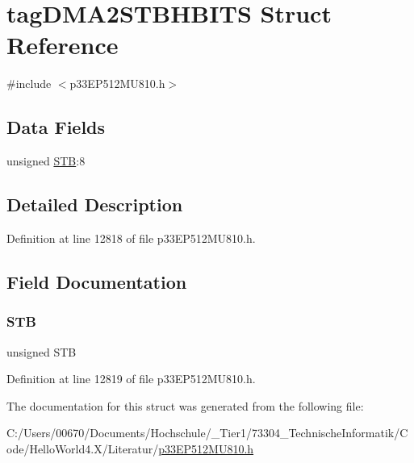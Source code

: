 \hypertarget{structtag_d_m_a2_s_t_b_h_b_i_t_s}{}\section{tag\+D\+M\+A2\+S\+T\+B\+H\+B\+I\+TS Struct Reference}
\label{structtag_d_m_a2_s_t_b_h_b_i_t_s}


{\ttfamily \#include $<$p33\+E\+P512\+M\+U810.\+h$>$}

\subsection*{Data Fields}
\begin{DoxyCompactItemize}
\item 
unsigned \hyperlink{structtag_d_m_a2_s_t_b_h_b_i_t_s_a9bd043a4db27e09b5035a563a8758fe7}{S\+TB}\+:8
\end{DoxyCompactItemize}


\subsection{Detailed Description}


Definition at line 12818 of file p33\+E\+P512\+M\+U810.\+h.



\subsection{Field Documentation}
\mbox{\label{structtag_d_m_a2_s_t_b_h_b_i_t_s_a9bd043a4db27e09b5035a563a8758fe7}} 
\subsubsection{\texorpdfstring{S\+TB}{STB}}
{\footnotesize\ttfamily unsigned S\+TB}



Definition at line 12819 of file p33\+E\+P512\+M\+U810.\+h.



The documentation for this struct was generated from the following file\+:\begin{DoxyCompactItemize}
\item 
C\+:/\+Users/00670/\+Documents/\+Hochschule/\+\_\+\+Tier1/73304\+\_\+\+Technische\+Informatik/\+Code/\+Hello\+World4.\+X/\+Literatur/\hyperlink{p33_e_p512_m_u810_8h}{p33\+E\+P512\+M\+U810.\+h}\end{DoxyCompactItemize}
